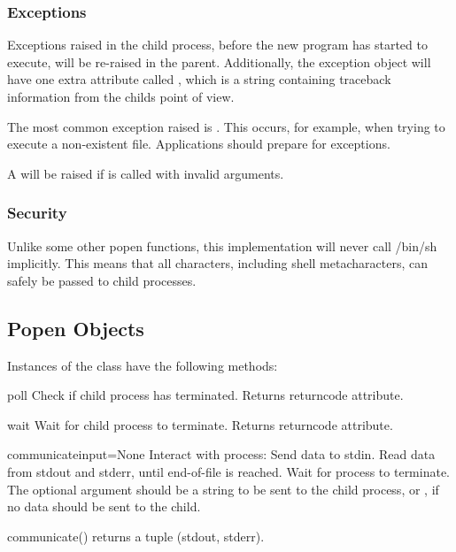 \subsubsection{Exceptions}

Exceptions raised in the child process, before the new program has
started to execute, will be re-raised in the parent.  Additionally,
the exception object will have one extra attribute called
, which is a string containing traceback
information from the childs point of view.

The most common exception raised is .  This occurs,
for example, when trying to execute a non-existent file.  Applications
should prepare for  exceptions.

A  will be raised if  is called
with invalid arguments.


\subsubsection{Security}

Unlike some other popen functions, this implementation will never call
/bin/sh implicitly.  This means that all characters, including shell
metacharacters, can safely be passed to child processes.


\subsection{Popen Objects}

Instances of the  class have the following methods:

\begin{methoddesc}{poll}{}
Check if child process has terminated.  Returns returncode
attribute.
\end{methoddesc}

\begin{methoddesc}{wait}{}
Wait for child process to terminate.  Returns returncode attribute.
\end{methoddesc}

\begin{methoddesc}{communicate}{input=None}
Interact with process: Send data to stdin.  Read data from stdout and
stderr, until end-of-file is reached.  Wait for process to terminate.
The optional  argument should be a string to be sent to the
child process, or , if no data should be sent to the child.

communicate() returns a tuple (stdout, stderr).

\end{methoddesc}

